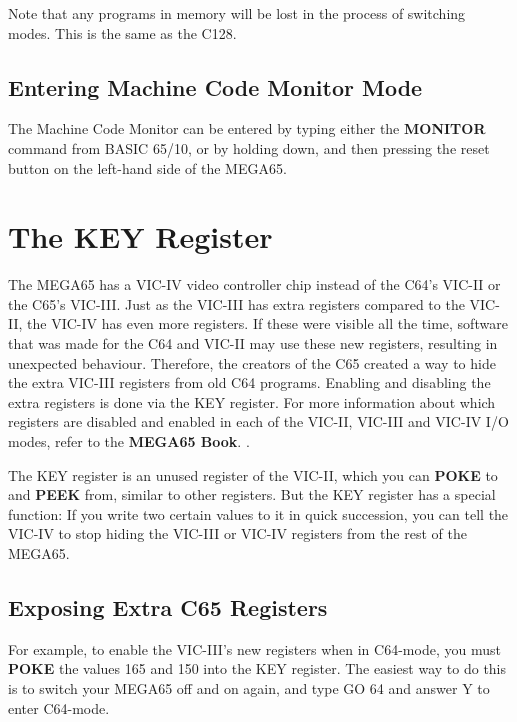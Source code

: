 Note that any programs in memory will be lost in the process of switching modes. This is the same as the C128.

\subsection{Entering Machine Code Monitor Mode}

The Machine Code Monitor can be entered by typing either the {\bf MONITOR}
command from BASIC 65/10, or by holding 
down, and then pressing the reset button on the left-hand side of the
MEGA65.

\section{The KEY Register}

The MEGA65 has a VIC-IV video controller chip instead of the C64's VIC-II or
the C65's VIC-III.  Just as the VIC-III has extra registers compared to the
VIC-II, the VIC-IV has even more registers.  If these were visible all the time,
software that was made for the C64 and VIC-II may use these
new registers, resulting in unexpected behaviour.  Therefore, the
creators of the C65 created a way to hide the extra VIC-III registers from old
C64 programs. Enabling and disabling the extra registers is done via the KEY register. For more information
about which registers are disabled and enabled in each of the
VIC-II, VIC-III and VIC-IV I/O modes, refer to
\ifdefined\printmanual
 the {\bf MEGA65 Book}.
\else
 .
\fi


The KEY register is an unused register of the VIC-II, which you can {\bf POKE} to and
 {\bf PEEK} from, similar to other registers. But the KEY register has a special function: If
you write two certain values to it in quick succession, you can tell the VIC-IV
to stop hiding the VIC-III or VIC-IV registers from the rest of the MEGA65.

\subsection{Exposing Extra C65 Registers}

For example, to enable the VIC-III's new registers when in C64-mode, you must {\bf POKE} the values 165 and 150
into the KEY register. The easiest way to do this is to switch your MEGA65 off and on again, and type GO 64
and answer Y to enter C64-mode.


